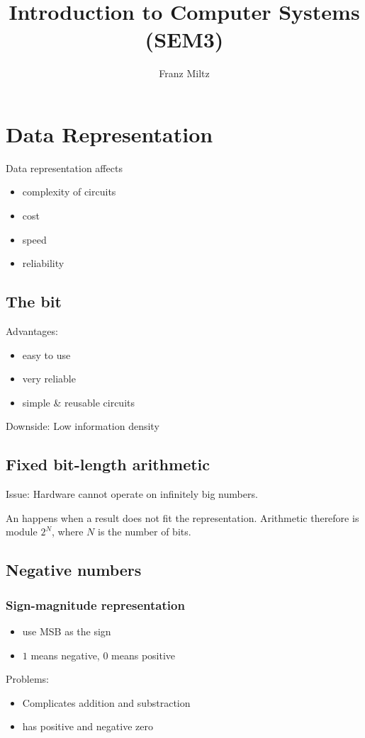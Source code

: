 \documentclass{article}
\begin{document}
\title{Introduction to Computer Systems (SEM3)}
\author{Franz Miltz}
\maketitle
\tableofcontents
\pagebreak
\section{Data Representation}
Data representation affects
\begin{itemize}
	\item complexity of circuits
	\item cost
	\item speed 
	\item reliability
\end{itemize}
\subsection{The bit}
Advantages:
\begin{itemize}
	\item easy to use
	\item very reliable
	\item simple \& reusable circuits
\end{itemize}
Downside: Low information density
\subsection{Fixed bit-length arithmetic}
Issue: Hardware cannot operate on infinitely big numbers.
\begin{definition}
	An  happens when a result does not fit the representation.
	Arithmetic therefore is module $2^N$, where $N$ is the number of bits.
\end{definition}
\subsection{Negative numbers}
\subsubsection{Sign-magnitude representation}
\begin{itemize}
	\item use MSB as the sign
	\item $1$ means negative, $0$ means positive
\end{itemize}
Problems: \begin{itemize}
	\item Complicates addition and substraction
	\item has positive and negative zero
\end{itemize}
\end{document}

